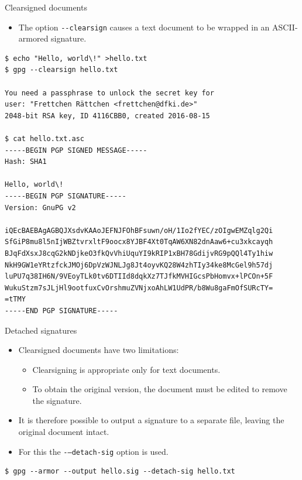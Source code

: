 \documentclass[
mode=present,
paper=smartboard,
size=20pt,
]{powerdot}
\newcommand\vsp{\vspace{-16mm}}
\newcommand{\clopt}[1]{\texttt{{-}#1}}
\begin{document}
\makeatletter\renewcommand{\verbatim@font}{\tiny\tt}\makeatother
\begin{slide}[method=direct]{Clearsigned documents}
  \begin{itemize}
  \item The option \clopt{-clearsign} causes a text document to be
    wrapped in an ASCII-armored signature.
  \end{itemize}
\vsp
\begin{verbatim}
$ echo "Hello, world\!" >hello.txt
$ gpg --clearsign hello.txt

You need a passphrase to unlock the secret key for
user: "Frettchen Rättchen <frettchen@dfki.de>"
2048-bit RSA key, ID 4116CBB0, created 2016-08-15

$ cat hello.txt.asc
-----BEGIN PGP SIGNED MESSAGE-----
Hash: SHA1

Hello, world\!
-----BEGIN PGP SIGNATURE-----
Version: GnuPG v2

iQEcBAEBAgAGBQJXsdvKAAoJEFNJFOhBFsuwn/oH/1Io2fYEC/zOIgwEMZqlg2Qi
SfGiP8mu8l5nIjWBZtvrxltF9oocx8YJBF4Xt0TqAW6XN82dnAaw6+cu3xkcayqh
BJqFdXsxJ8cqG2kNDjkeO3fkQvVhiUquYI9kRIP1xBH78GdijvRG9pQQl4Ty1hiw
NkH9GW1eYRtzfckJMOj6DpVzWJNLJg8Jt4oyvKQ28W4zhTIy34ke8McGel9h57dj
luPU7q38IH6N/9VEoyTLk0tv6DTIId8dqkXz7TJfkMVHIGcsPbHomvx+lPCOn+5F
WukuStzm7sJLjHl9ootfuxCvOrshmuZVNjxoAhLW1UdPR/b8Wu8gaFmOfSURcTY=
=tTMY
-----END PGP SIGNATURE-----
\end{verbatim}
\end{slide}

\makeatletter\renewcommand{\verbatim@font}{\footnotesize\tt}\makeatother
\begin{slide}[method=direct]{Detached signatures}
  \begin{itemize}
  \item Clearsigned documents have two limitations:
    \begin{itemize}
    \item Clearsigning is appropriate only for text documents.
    \item To obtain the original version, the document must be edited
      to remove the signature.
    \end{itemize}
  \item It is therefore possible to output a signature to a separate
    file, leaving the original document intact.
  \item For this the \clopt{--detach-sig} option is used.
  \end{itemize}
\begin{verbatim}
$ gpg --armor --output hello.sig --detach-sig hello.txt
\end{verbatim}
\end{slide}
\end{document}
